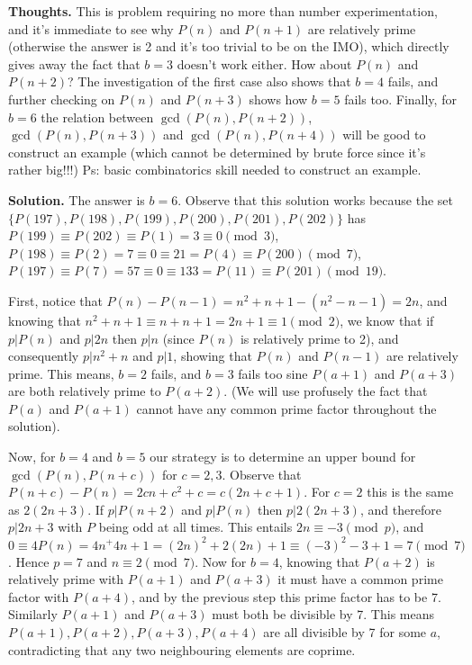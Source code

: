 \documentclass[11pt,a4paper]{article}
\begin{document}
\begin{itemize}
\textbf{Thoughts.} This is  problem requiring no more than number experimentation, 
and it's immediate to see why $P(n)$ and $P(n+1)$ are relatively prime (otherwise the answer is 2 and it's too trivial to be on the IMO), which directly gives away the fact that $b=3$ doesn't work either. 
How about $P(n)$ and $P(n+2)$? The investigation of the first case also shows that $b=4$ fails, and further checking on $P(n)$ and $P(n+3)$ shows how $b=5$ fails too. 
Finally, for $b=6$ the relation between $\gcd(P(n), P(n+2))$, $\gcd(P(n), P(n+3))$ and $\gcd(P(n), P(n+4))$ will be good to construct an example (which cannot be determined by brute force since it's rather big!!!)
Ps: basic combinatorics skill needed to construct an example. 

\textbf{Solution.} The answer is $b=6.$ 
Observe that this solution works because the set $\{P(197), P(198), P(199), P(200), P(201), P(202)\}$ has 
$P(199)\equiv P(202)\equiv P(1)=3\equiv 0\pmod{3}$, 
$P(198)\equiv P(2)=7\equiv 0\equiv 21=P(4)\equiv P(200)\pmod {7}$, 
$P(197)\equiv P(7)=57\equiv 0\equiv 133=P(11)\equiv P(201)\pmod{19}$. 

First, notice that $P(n)-P(n-1)=n^2+n+1-(n^2-n-1)=2n$, 
and knowing that $n^2+n+1\equiv n+n+1=2n+1\equiv 1\pmod{2}$, 
we know that if $p|P(n)$ and $p|2n$ then $p|n$ (since $P(n)$ is relatively prime to 2), 
and consequently $p|n^2+n$ and $p|1$, showing that $P(n)$ and $P(n-1)$ are relatively prime. 
This means, $b=2$ fails, and $b=3$ fails too sine $P(a+1)$ and $P(a+3)$ are both relatively prime to $P(a+2)$. 
(We will use profusely the fact that $P(a)$ and $P(a+1)$ cannot have any common prime factor throughout the solution). 

Now, for $b=4$ and $b=5$ our strategy is to determine an upper bound for $\gcd(P(n), P(n+c))$ for $c=2, 3$. 
Observe that $P(n+c)-P(n)=2cn+c^2+c=c(2n+c+1)$. 
For $c=2$ this is the same as $2(2n+3)$. 
If $p|P(n+2)$ and $p|P(n)$ then $p|2(2n+3)$, and therefore $p|2n+3$ with $P$ being odd at all times. 
This entails $2n\equiv -3\pmod{p}$, 
and $0\equiv 4P(n)=4n^+4n+1=(2n)^2+2(2n)+1\equiv (-3)^2-3+1=7\pmod{7}$. 
Hence $p=7$ and $n\equiv 2\pmod{7}$. 
Now for $b=4$, knowing that $P(a+2)$ is relatively prime with $P(a+1)$ and $P(a+3)$ it must have a common prime factor with $P(a+4)$, 
and by the previous step this prime factor has to be 7. 
Similarly $P(a+1)$ and $P(a+3)$ must both be divisible by 7. 
This means $P(a+1), P(a+2), P(a+3), P(a+4)$ are all divisible by 7 for some $a$, contradicting that any two neighbouring elements are coprime. 


\end{itemize}
\end{document}

